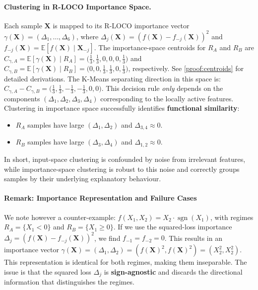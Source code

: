 \documentclass{article}
\theoremstyle{plain}
\theoremstyle{definition}
\theoremstyle{remark}
\begin{document}
\paragraph{Clustering in R-LOCO Importance Space.}
Each sample $\mathbf{X}$ is mapped to its R-LOCO importance vector $\gamma(\mathbf{X}) = (\Delta_1, \ldots, \Delta_6)$, where $\Delta_j(\mathbf{X}) = (f(\mathbf{X}) - f_{-j}(\mathbf{X}))^2$ and $f_{-j}(\mathbf{X}) = \mathbb{E}[f(\mathbf{X}) \mid \mathbf{X}_{-j}]$. The importance-space centroids for $R_A$ and $R_B$ are $C_{\gamma, A} = \mathbb{E}[\gamma(\mathbf{X}) \mid R_A] = \bigl(\frac{1}{3}, \frac{1}{3}, 0, 0, 0, \frac{1}{3}\bigr)$ and $C_{\gamma, B}= \mathbb{E}[\gamma(\mathbf{X}) \mid R_B] = \bigl(0, 0, \frac{1}{3}, \frac{1}{3}, 0, \frac{1}{3}\bigr)$, respectively. See \ref{proof:centroids} for detailed derivations. The K-Means separating direction in this space is:
$C_{\gamma, A} - C_{\gamma, B} = \bigl(\frac{1}{3}, \frac{1}{3}, -\frac{1}{3}, -\frac{1}{3}, 0, 0\bigr).$
This decision rule \emph{only} depends on the components $(\Delta_1, \Delta_2, \Delta_3, \Delta_4)$ corresponding to the locally active features. Clustering in importance space successfully identifies \textbf{functional similarity}:
\begin{itemize}
    \item $R_A$ samples have large $(\Delta_1, \Delta_2)$ and $\Delta_{3,4} \approx 0$.
    \item $R_B$ samples have large $(\Delta_3, \Delta_4)$ and $\Delta_{1,2} \approx 0$.
\end{itemize}
In short, input-space clustering is confounded by noise from irrelevant features, while importance-space clustering is robust to this noise and correctly groups samples by their underlying explanatory behaviour.

\paragraph{Remark: Importance Representation and Failure Cases}
We note however a counter-example: $f(X_1, X_2) = X_2 \cdot \operatorname{sgn}(X_1)$, with regimes $R_A = \{X_1 < 0\}$ and $R_B = \{X_1 \ge 0\}$. If we use the squared-loss importance $\Delta_j = (f(\mathbf{X}) - f_{-j}(\mathbf{X}))^2$, we find $f_{-1} = f_{-2} = 0$. This results in an importance vector $\gamma(\mathbf{X}) = (\Delta_1, \Delta_2) = (f(\mathbf{X})^2, f(\mathbf{X})^2) = (X_2^2, X_2^2)$. This representation is identical for both regimes, making them inseparable. The issue is that the squared loss $\Delta_j$ is \textbf{sign-agnostic} and discards the directional information that distinguishes the regimes.
\end{document}
